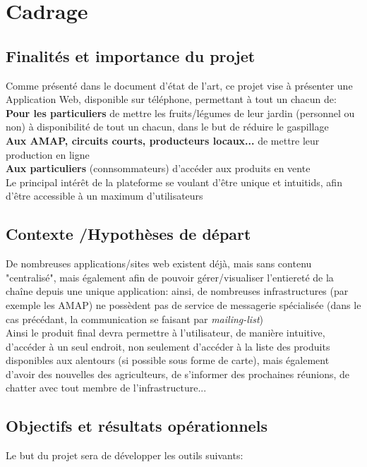 \usepackage{graphicx}

\chapter*{Cadrage}

\section*{Finalités et importance du projet}
Comme présenté dans le document d'état de l'art, ce projet vise à présenter une Application Web, disponible sur téléphone, permettant à tout un chacun de: \\
	\textbf{Pour les particuliers} de mettre les fruits/légumes de leur jardin (personnel ou non) à disponibilité de tout un chacun, dans le but de réduire le gaspillage \\
	\textbf{Aux AMAP, circuits courts, producteurs locaux...} de mettre leur production en ligne \\
	\textbf{Aux particuliers} (connsommateurs) d'accéder aux produits en vente\\

Le principal intérêt de la plateforme se voulant d'être unique et intuitids, afin d'être accessible à un maximum d'utilisateurs

\section*{Contexte /Hypothèses de départ}
De nombreuses applications/sites web existent déjà, mais sans contenu "centralisé", mais également afin de pouvoir gérer/visualiser l'entiereté de la chaîne depuis une unique application: ainsi, de nombreuses infrastructures (par exemple les AMAP) ne possèdent pas de service de messagerie spécialisée (dans le cas précédant, la communication se faisant par \textit{mailing-list})\\
Ainsi le produit final devra permettre à l'utilisateur, de manière intuitive, d'accéder à un seul endroit, non seulement d'accéder à la liste des produits disponibles aux alentours (si possible sous forme de carte), mais également d'avoir des nouvelles des agriculteurs, de s'informer des prochaines réunions, de chatter avec tout membre de l'infrastructure...

\section*{Objectifs et résultats opérationnels}
Le but du projet sera de développer les outils suivants:


